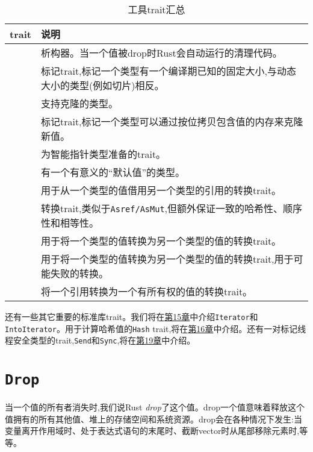 \begin{table}[htbp]
    \centering
    \caption{工具trait汇总}
    \label{t13-1}
    \begin{tabular}{p{}p{}}
        \hline
        \textbf{trait}  & \textbf{说明} \\
        \hline

        \nameref{drop}  & 析构器。当一个值被drop时Rust会自动运行的清理代码。    \\
        \rowcolor{tablecolor}
        \nameref{sized} & 标记trait,标记一个类型有一个编译期已知的固定大小,与动态大小的类型(例如切片)相反。 \\
        \nameref{clone} & 支持克隆的类型。  \\
        \rowcolor{tablecolor}
        \nameref{Copy}  & 标记trait,标记一个类型可以通过按位拷贝包含值的内存来克隆新值。   \\
        \nameref{deref} & 为智能指针类型准备的trait。   \\
        \rowcolor{tablecolor}
        \nameref{default}   & 有一个有意义的“默认值”的类型。    \\
        \nameref{asref} & 用于从一个类型的值借用另一个类型的引用的转换trait。   \\
        \rowcolor{tablecolor}
        \nameref{borrow}& 转换trait,类似于\texttt{Asref/AsMut},但额外保证一致的哈希性、顺序性和相等性。   \\
        \nameref{from}  & 用于将一个类型的值转换为另一个类型的值的转换trait。   \\
        \rowcolor{tablecolor}
        \nameref{tryfrom}   & 用于将一个类型的值转换为另一个类型的值的转换trait,用于可能失败的转换。   \\
        \nameref{toowned}   & 将一个引用转换为一个有所有权的值的转换trait。 \\
    \end{tabular}
\end{table}

还有一些其它重要的标准库trait。我们将在\hyperref[ch15]{第15章}中介绍\texttt{Iterator}和\texttt{IntoIterator}。用于计算哈希值的\texttt{Hash} trait,将在\hyperref[ch16]{第16章}中介绍。还有一对标记线程安全类型的trait,\texttt{Send}和\texttt{Sync},将在\hyperref[ch19]{第19章}中介绍。

\section{\texttt{Drop}}\label{drop}

当一个值的所有者消失时,我们说Rust \emph{drop}了这个值。drop一个值意味着释放这个值拥有的所有其他值、堆上的存储空间和系统资源。drop会在各种情况下发生:当变量离开作用域时、处于表达式语句的末尾时、截断vector时从尾部移除元素时,等等。

